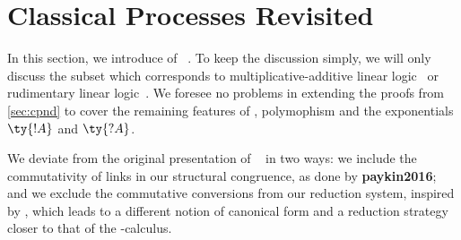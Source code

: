 \documentclass[UKenglish]{llncs}
\begin{document}
\section{Classical Processes Revisited}\label{sec:cp-revisited}

In this section, we introduce of \cp~\cite{wadler2012,lindley2015semantics}.
To keep the discussion simply, we will only discuss the subset which corresponds
to multiplicative-additive linear logic~\cite[MALL]{girard1987} or rudimentary
linear logic~\cite[RLL]{girard1992}.
We foresee no problems in extending the proofs from \cref{sec:cpnd} to
cover the remaining features of \cp, polymophism and the exponentials $\ty{!A}$
and $\ty{?A}$. 

We deviate from the original presentation of \cp~\cite{wadler2012} in two ways:
we include the commutativity of links in our structural congruence, as done by
\textbf{paykin2016}; and we exclude the commutative conversions from our
reduction system, inspired by , which leads to a
different notion of canonical form and a reduction strategy closer to that of
the \textpi-calculus.
\end{document}
